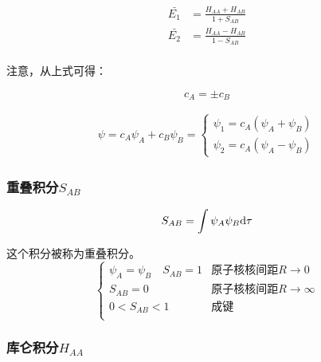\begin{align*}
    \bar{E_1} & = \frac{H_{AA} + H_{AB}}{1 + S_{AB}} \\
    \bar{E_2} & = \frac{H_{AA} - H_{AB}}{1 - S_{AB}} \\
\end{align*}

注意，从上式可得：

\begin{equation*}
    c_A = \pm c_B
\end{equation*}

\begin{align*}
    \psi = c_A \psi_A + c_B \psi_B = \begin{cases}
                                         \psi_1 = c_A(\psi_A + \psi_B) \\
                                         \psi_2 = c_A(\psi_A - \psi_B)
                                     \end{cases}
\end{align*}



\subsubsection{重叠积分$S_{AB}$}

\begin{equation*}
    S_{AB} = \int \psi_A \psi_B \mathrm{d} \tau
\end{equation*}

这个积分被称为重叠积分。
\begin{equation*}
    \begin{cases}
        \psi_A = \psi_B \quad S_{AB} = 1 & \mbox{原子核核间距} R \to 0      \\
        S_{AB} = 0                       & \mbox{原子核核间距} R \to \infty \\
        0 < S_{AB} < 1                   & \mbox{成键}                      \\
    \end{cases}
\end{equation*}

\subsubsection{库仑积分$H_{AA}$}

